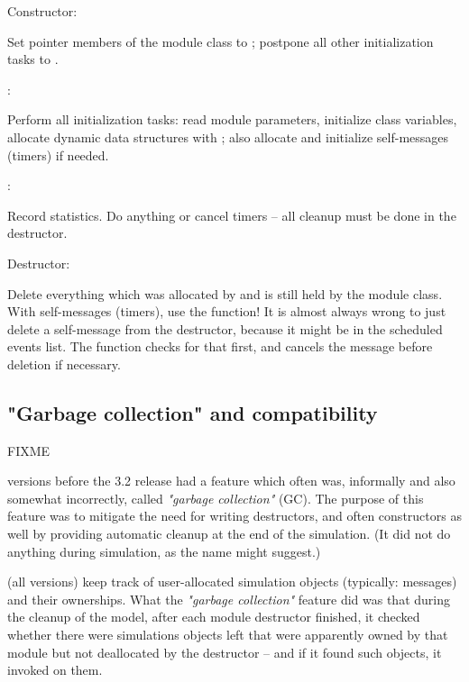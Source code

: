 \begin{description}

\item Constructor:

Set pointer members of the module class to ; postpone all other
initialization tasks to .

\item {}:

Perform all initialization tasks: read module parameters, initialize
class variables, allocate dynamic data structures with ;
also allocate and initialize self-messages (timers) if needed.

\item {}:

Record statistics. Do   anything or cancel timers --
all cleanup must be done in the destructor.

\item Destructor:

Delete everything which was allocated by  and is still held
by the module class. With self-messages (timers), use the
 function! It is almost always wrong
to just delete a self-message from the destructor, because it might be
in the scheduled events list. The  function
checks for that first, and cancels the message before deletion if necessary.

\end{description}


\subsection{"Garbage collection" and compatibility}
\label{sec:garbage-collection}

FIXME

{\opp} versions before the 3.2 release had a feature which often was,
informally and also somewhat incorrectly, called \textit{"garbage
collection"} (GC). The purpose of this feature was to mitigate the need for
writing destructors, and often constructors as well by providing automatic
cleanup at the end of the simulation. (It did not do anything during
simulation, as the name might suggest.)

{\opp} (all versions) keep track of user-allocated simulation objects
(typically: messages) and their ownerships. What the \textit{"garbage
collection"} feature did was that during the cleanup of the model, after
each module destructor finished, it checked whether there were simulations
objects left that were apparently owned by that module but not deallocated
by the destructor -- and if it found such objects, it invoked 
on them.

